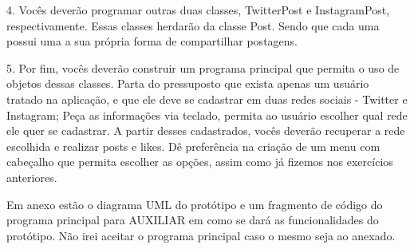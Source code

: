 4. Vocês deverão programar outras duas classes, TwitterPost e InstagramPost, respectivamente. Essas classes herdarão da classe Post. Sendo que cada uma possui uma a sua própria forma de compartilhar postagens.

5. Por fim, vocês deverão construir um programa principal que permita o uso de objetos dessas classes. Parta do pressuposto que exista apenas um usuário tratado na aplicação, e que ele deve se cadastrar em duas redes sociais - Twitter e Instagram; Peça as informações via teclado, permita ao usuário escolher qual rede ele quer se cadastrar. A partir desses cadastrados, vocês deverão recuperar a rede escolhida e realizar posts e likes. Dê preferência na criação de um menu com cabeçalho que permita escolher as opções, assim como já fizemos nos exercícios anteriores.

Em anexo estão o diagrama UML do protótipo e um fragmento de código do programa principal para AUXILIAR em como se dará as funcionalidades do protótipo. Não irei aceitar o programa principal caso o mesmo seja ao anexado.